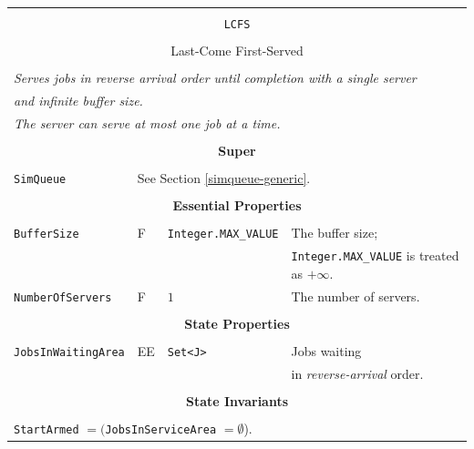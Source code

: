 \documentclass[12pt]{book}
\begin{document}
\begin{tabular}{|l|l|l|l|}
\hline
\multicolumn{4}{|c|}{} \\
\multicolumn{4}{|c|}{\lstinline[basicstyle=\large]{LCFS}} \\
\multicolumn{4}{|c|}{} \\
\multicolumn{4}{|c|}{Last-Come First-Served} \\
\multicolumn{4}{|c|}{} \\
\hline
\multicolumn{4}{|l|}{\em Serves jobs in reverse arrival order until completion with a single server} \\
\multicolumn{4}{|l|}{\em and infinite buffer size.} \\
\multicolumn{4}{|l|}{\em The server can serve at most one job at a time.} \\
\hline
\multicolumn{4}{|c|}{} \\
\multicolumn{4}{|c|}{\bf Super} \\
\multicolumn{4}{|c|}{} \\
\hline
\lstinline|SimQueue| & \multicolumn{3}{|l|}{See Section \ref{simqueue-generic}.} \\
\hline
\multicolumn{4}{|c|}{} \\
\multicolumn{4}{|c|}{\bf Essential Properties} \\
\multicolumn{4}{|c|}{} \\
\hline
\lstinline|BufferSize|      & F & \lstinline|Integer.MAX_VALUE|
                            & The buffer size; \\
                        & & & \lstinline|Integer.MAX_VALUE| is treated as $+\infty$. \\
\hline
\lstinline|NumberOfServers| & F & $1$
                            & The number of servers. \\
\hline
\multicolumn{4}{|c|}{} \\
\multicolumn{4}{|c|}{\bf State  Properties} \\
\multicolumn{4}{|c|}{} \\
\hline
\lstinline|JobsInWaitingArea| & EE & \lstinline|Set<J>| & Jobs waiting \\
                              &    &                    & in {\em reverse-arrival\/} order. \\
\hline
\multicolumn{4}{|c|}{} \\
\multicolumn{4}{|c|}{\bf State  Invariants} \\
\multicolumn{4}{|c|}{} \\
\hline
\multicolumn{4}{|l|}{\lstinline|StartArmed| $= ($\lstinline|JobsInServiceArea| $= \emptyset$).} \\

\end{tabular}
\end{document}

